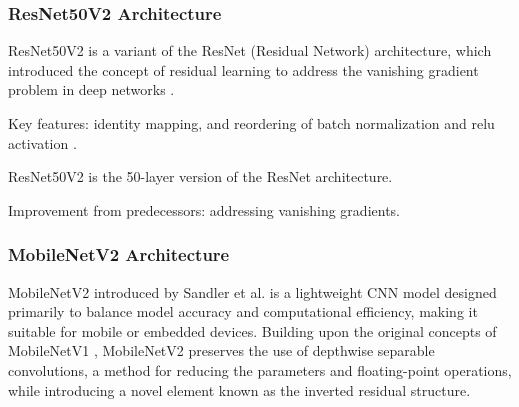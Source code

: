 
\subsubsection{ResNet50V2 Architecture}
ResNet50V2 is a variant of the ResNet (Residual Network) architecture, which introduced the concept of residual learning to address the vanishing gradient problem in deep networks \cite{he2016}. 

Key features: identity mapping, and reordering of batch normalization and relu activation \cite{he2016identitymappingsdeepresidual}.

ResNet50V2 is the 50-layer version of the ResNet architecture. 

Improvement from predecessors: addressing vanishing gradients.


\subsubsection{MobileNetV2 Architecture}
MobileNetV2 introduced by Sandler et al. \cite{sandler2018mobilenetv2} is a lightweight CNN model designed primarily to balance model accuracy and computational efficiency, making it suitable for mobile or embedded devices. Building upon the original concepts of MobileNetV1 \cite{howard2017mobilenetsefficientconvolutionalneural}, MobileNetV2 preserves the use of depthwise separable convolutions, a method for reducing the parameters and floating-point operations, while introducing a novel element known as the inverted residual structure. 


